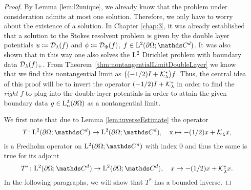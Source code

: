 \begin{proof}
  By Lemma \ref{lem:l2unique}, we already know that the problem under consideration admits at most one solution.
  Therefore, we only have to worry about the existence of a solution.
  In Chapter \ref{chap:3}, it was already established that a solution to the Stokes resolvent problem is given by the double layer potentials $u \coloneqq \mathcal{D}_\lambda(f)$ and $\phi \coloneqq \mathcal{D}_\Phi(f)$, $f \in \Ell^2(\partial\Omega; \C^d)$.
  It was also shown that in this way one also solves the $\mathrm{L}^2$ Dirichlet problem with boundary data $\mathcal{D}_\lambda(f)_+$.
  From Theorem~\ref{thm:nontangentialLimitDoubleLayer} we know that we find this nontangential limit as $\big((-1/2)I + \mathcal{K}_\lambda^*\big)f$.
  Thus, the central idea of this proof will be to invert the operator $(-1/2)I + \mathcal{K}_\lambda^*$ in order to find the \emph{right} $f$ to plug into the double layer potentials in order to attain the given boundary data $g \in \mathrm{L}^2_n(\partial\Omega)$ as a nontangential limit.
  
  We first note that due to Lemma \ref{lem:inverseEstimate} the operator
  \begin{align*}
    T \colon \Ell^2(\partial\Omega; \C^d) \to \Ell^2(\partial\Omega; \C^d), \quad\text x \mapsto -(1/2)x  + \K_{\bar \lambda}x,
  \end{align*}
  is a Fredholm operator on $\Ell^2(\partial\Omega; \C^d)$ with index $0$ and thus the same is true for its adjoint 
  \begin{align*}
    T^* \colon \Ell^2(\partial\Omega; \C^d) \to \Ell^2(\partial\Omega; \C^d),\quad x \mapsto  -(1/2)x + \K_{\bar\lambda}^*x.
  \end{align*}
  In the following paragraphs, we will show that $T^*$ has a bounded inverse.


\end{proof}
